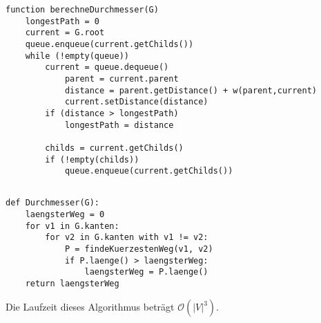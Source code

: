 \documentclass[10pt,a4paper,oneside,ngerman,numbers=noenddot]{scrartcl}
\begin{document}
		\begin{verbatim}
function berechneDurchmesser(G)
    longestPath = 0
    current = G.root
    queue.enqueue(current.getChilds())
    while (!empty(queue))
        current = queue.dequeue()
	        parent = current.parent
	        distance = parent.getDistance() + w(parent,current)
	        current.setDistance(distance)
        if (distance > longestPath)
            longestPath = distance
        
        childs = current.getChilds()
        if (!empty(childs))
            queue.enqueue(current.getChilds())
		\end{verbatim}
		            
	\subsection{} %
		\begin{verbatim}
def Durchmesser(G):
	laengsterWeg = 0
	for v1 in G.kanten:
		for v2 in G.kanten with v1 != v2:
			P = findeKuerzestenWeg(v1, v2)
			if P.laenge() > laengsterWeg:
				laengsterWeg = P.laenge()
	return laengsterWeg
		\end{verbatim}
    	
    	Die Laufzeit dieses Algorithmus beträgt $\mathcal{O}(|V|^3)$.
\section{} %
\end{document}
